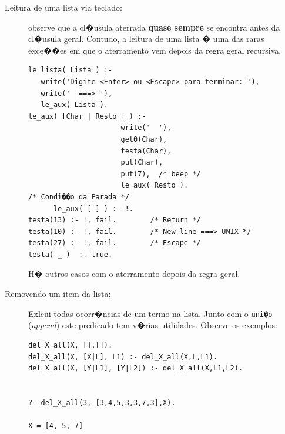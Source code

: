 \documentclass[final,a4paper]{article}
\begin{document}
\begin{description}
\newpage
\item [Leitura de uma lista via teclado:] observe que  a cl�usula aterrada {\bf quase sempre} se encontra antes da cl�usula geral. Contudo, a leitura de uma lista � uma das raras exce��es em que o aterramento vem depois da regra geral recursiva.

\begin{verbatim}
le_lista( Lista ) :-
   write('Digite <Enter> ou <Escape> para terminar: '),
   write('  ===> '),
   le_aux( Lista ).
le_aux( [Char | Resto ] ) :-
                      write('  '),
                      get0(Char),
                      testa(Char),
                      put(Char),
                      put(7),  /* beep */
                      le_aux( Resto ).
/* Condi��o da Parada */
      le_aux( [ ] ) :- !.
testa(13) :- !, fail.        /* Return */
testa(10) :- !, fail.        /* New line ===> UNIX */
testa(27) :- !, fail.        /* Escape */
testa( _ )  :- true.
\end{verbatim}

H� outros casos com o aterramento depois da regra geral.

\newpage
\item[Removendo um item da lista:] Exlcui todas
ocorr�ncias de um termo na lista. Junto com o {\tt uni�o} 
({\em append}) este predicado tem v�rias utilidades. Observe
os exemplos:


\begin{lstlisting}
del_X_all(X, [],[]).
del_X_all(X, [X|L], L1) :- del_X_all(X,L,L1).
del_X_all(X, [Y|L1], [Y|L2]) :- del_X_all(X,L1,L2).


?- del_X_all(3, [3,4,5,3,3,7,3],X).

X = [4, 5, 7] 


\end{lstlisting}
\end{description}
\end{document}
